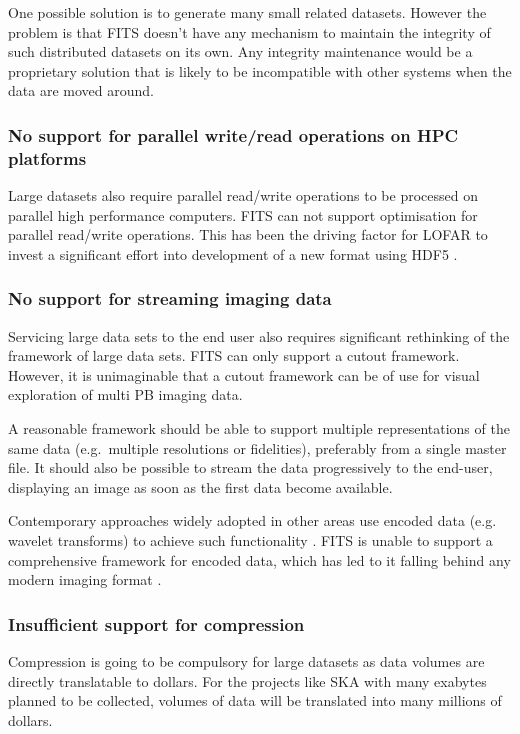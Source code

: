 \documentclass[final,authoryear,5p,times,twocolumn]{elsarticle}
\begin{document}
One possible solution is to generate many small related datasets. However the problem
is that FITS doesn't have any mechanism to maintain the integrity of such distributed
datasets on its own. Any integrity maintenance would be a proprietary solution that is likely
to be incompatible with other systems when the data are moved around.

\subsubsection{No support for parallel write/read operations on HPC platforms}

Large datasets also require parallel read/write operations to be processed on parallel high performance
computers. FITS can not support optimisation for parallel read/write operations. This has been
the driving factor for LOFAR to invest a significant effort into development of a new format using
HDF5  \citep{2012ASPC..461..283A}.

\subsubsection{No support for streaming imaging data}

Servicing large data sets to the end user also requires significant
rethinking of the framework of large data sets. FITS can only support a
cutout framework.  However, it is unimaginable that a cutout framework
can be of use for visual exploration of multi PB imaging data.

A reasonable framework should be able to support multiple representations
of the same data (e.g.\ multiple resolutions or fidelities), preferably
from a single master file. It should also be possible to stream the data
progressively to the end-user, displaying an image as soon
as the first data become available.

Contemporary approaches widely adopted in other areas use encoded data
(e.g. wavelet transforms) to achieve such functionality \citep{2003SPIE.5150..791T}. FITS is unable to support
a comprehensive framework for encoded data, which has led to it
falling behind any modern imaging format \citep[see e.g.][]{2013arXiv1307.5123K}.

\subsubsection{Insufficient support for compression}

Compression is going to be compulsory for large datasets as data volumes
are directly translatable to dollars. For the projects like SKA with many exabytes planned to be collected,
volumes of data will be translated into many millions of dollars.
\end{document}
